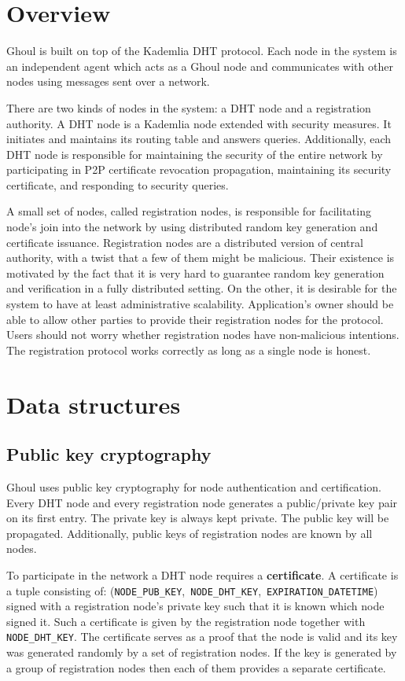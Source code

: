 \section{Overview}
\label{sec:ghoul_overview}
Ghoul is built on top of the Kademlia DHT protocol. Each node in the system is
an independent agent which acts as a Ghoul node and communicates with other
nodes using messages sent over a network.

There are two kinds of nodes in the system: a DHT node and a registration
authority. A DHT node is a Kademlia node extended with security measures.
It initiates and maintains its routing table and answers queries. Additionally,
each DHT node is responsible for maintaining the security of the entire network
by participating in P2P certificate revocation propagation, maintaining its
security certificate, and responding to security queries.

A small set of nodes, called registration nodes, is responsible for facilitating
node’s join into the network by using distributed random key generation and
certificate issuance. Registration nodes are a distributed version of central
authority, with a twist that a few of them might be malicious. Their existence
is motivated by the fact that it is very hard to guarantee random key generation
and verification in a fully distributed setting. On the other, it is desirable
for the system to have at least administrative scalability. Application's owner
should be able to allow other parties to provide their registration nodes for
the protocol. Users should not worry whether registration nodes have
non-malicious intentions. The registration protocol works correctly as long as a
single node is honest.

\section{Data structures}
\label{sec:ghoul_data}

\subsection{Public key cryptography}
Ghoul uses public key cryptography for node authentication and certification.
Every DHT node and every registration node generates a public/private key pair
on its first entry. The private key is always kept private. The public key will
be propagated. Additionally, public keys of registration nodes are known by all
nodes.

To participate in the network a DHT node requires a \textbf{certificate}.
A certificate is a tuple consisting of:
(\texttt{NODE\_PUB\_KEY},~\texttt{NODE\_DHT\_KEY},~\texttt{EXPIRATION\_DATETIME})
signed with a registration node's private key such that it is known which node
signed it. Such a certificate is given by the registration node together with
\texttt{NODE\_DHT\_KEY}. The certificate serves as a proof that the node is
valid and its key was generated randomly by a set of registration nodes. If the
key is generated by a group of registration nodes then each of them provides a
separate certificate.


